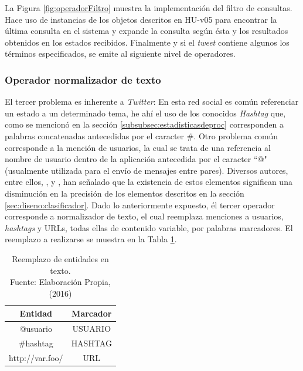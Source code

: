 La Figura \ref{fig:operadorFiltro} muestra la implementación del filtro de consultas. Hace uso de instancias de los objetos descritos en HU-v05 para encontrar la última consulta en el sistema y expande la consulta según ésta y los resultados obtenidos en los estados recibidos. Finalmente y si el \textit{tweet} contiene algunos los términos especificados, se emite al siguiente nivel de operadores.

\subsubsection*{Operador normalizador de texto}
\label{subsubsec:3op}

El tercer problema es inherente a \textit{Twitter}: En esta red social es común referenciar un estado a un determinado tema, he ahí el uso de los conocidos \textit{Hashtag} que, como se mencionó en la sección \ref{subsubsec:estadisticasdeproc} corresponden a palabras concatenadas antecedidas por el caracter \#. Otro problema común corresponde a la mención de usuarios, la cual se trata de una referencia al nombre de usuario dentro de la aplicación antecedida por el caracter ``@" (usualmente utilizada para el envío de mensajes entre pares). Diversos autores, entre ellos, \cite{NLPaccuracy}, \cite{NLPaccuracy1} y \cite{NLPaccuracy2}, han señalado que la existencia de estos elementos significan una disminución en la precisión de los elementos descritos en la sección \ref{sec:diseno:clasificador}. Dado lo anteriormente expuesto, él tercer operador corresponde a normalizador de texto, el cual reemplaza menciones a usuarios, \textit{hashtags} y URLs, todas ellas de contenido variable, por palabras marcadores. El reemplazo a realizarse se muestra en la Tabla \ref{tab:reemplazosDeEntidades}.

\begin{table}[H]
\centering
\caption[Reemplazo de entidades en texto.]{Reemplazo de entidades en texto.\\Fuente: Elaboración Propia, (2016)}
\label{tab:reemplazosDeEntidades}
\begin{tabular}{|c|c|}
\hline
\textbf{Entidad} & \textbf{Marcador} \\ \hline
@usuario         & USUARIO            \\ \hline
\#hashtag        & HASHTAG            \\ \hline
http://var.foo/  & URL                \\ \hline
\end{tabular}
\end{table}

